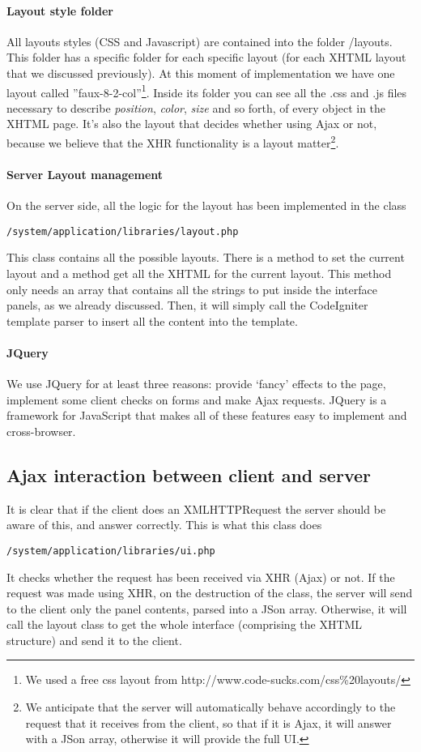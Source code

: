 \paragraph{Layout style folder}
All layouts styles (CSS and Javascript) are contained into the folder /layouts. This folder has a specific folder for each specific layout (for each XHTML layout that we discussed previously). At this moment of implementation we have one layout called ''faux-8-2-col''\footnote{We used a free css layout from http://www.code-sucks.com/css\%20layouts/}. Inside its folder you can see all the .css and .js files necessary to describe \emph{position}, \emph{color}, \emph{size} and so forth, of every object in the XHTML page. It's also the layout that decides whether using Ajax or not, because we believe that the XHR functionality is a layout matter\footnote{We anticipate that the server will automatically behave accordingly to the request that it receives from the client, so that if it is Ajax, it will answer with a JSon array, otherwise it will provide the full UI.}.

\paragraph{Server Layout management}
On the server side, all the logic for the layout has been implemented in the class \begin{verbatim}/system/application/libraries/layout.php
\end{verbatim}
This class contains all the possible layouts. There is a method to set the current layout and a method get all the XHTML for the current layout. This method only needs an array that contains all the strings to put inside the interface panels, as we already discussed. Then, it will simply call the CodeIgniter template parser to insert all the content into the template.

\paragraph{JQuery}
We use JQuery for at least three reasons: provide `fancy' effects to the page, implement some client checks on forms and make Ajax requests. JQuery is a framework for JavaScript that makes all of these features easy to implement and cross-browser.

\subsection{Ajax interaction between client and server}
It is clear that if the client does an XMLHTTPRequest the server should be aware of this, and answer correctly. This is what this class does
\begin{verbatim}/system/application/libraries/ui.php
\end{verbatim}
It checks whether the request has been received via XHR (Ajax) or not. If the request was made using XHR, on the destruction of the class, the server will send to the client only the panel contents, parsed into a JSon array. Otherwise, it will call the layout class to get the whole interface (comprising the XHTML structure) and send it to the client.

